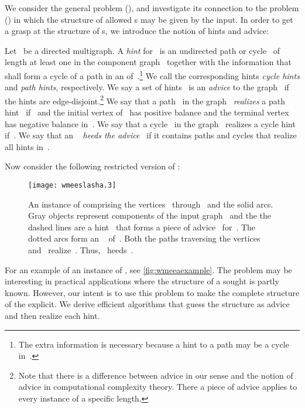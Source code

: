 We consider the general problem \pWMEE{} (\pWMEEs{}), and investigate its connection to the problem \pWMEEA{} (\pWMEEAs{}) in which the structure of allowed \EE s may be given by the input. In order to get a grasp at the structure of \EE s, we introduce the notion of hints and advice:
\begin{definition}
  Let~ be a directed multigraph. A \emph{hint} for~ is an undirected path or cycle~ of length at least one in the component graph~ together with the information that~ shall form a cycle of a path in an \EE{} of~.\footnote{The extra information is necessary because a hint to a path may be a cycle in~.} We call the corresponding hints \emph{cycle hints} and \emph{path hints}, respectively. We say a set of hints~ is an \emph{advice} to the graph~ if the hints are edge-disjoint.\footnote{Note that there is a difference between advice in our sense and the notion of advice in computational complexity theory. There a piece of advice applies to every instance of a specific length.} We say that a path~ in the graph~ \emph{realizes} a path hint~ if~ and the initial vertex of~ has positive balance and the terminal vertex has negative balance in~. We say that a cycle~ in the graph~ realizes a cycle hint~ if~. We say that an \EE~ \emph{heeds the advice~} if it contains paths and cycles that realize all hints in~.
\end{definition}
Now consider the following restricted version of \pWMEEs{}:
\begin{figure}
  \begin{center}
    \texttt{[image: wmeeslasha.3]}
    \caption{An instance of \pWMEEAs{} comprising the vertices~ through~ and the solid arcs. Gray objects represent components of the input graph~ and the the dashed lines are a hint~ that forms a piece of advice~ for~. The dotted arcs form an \EE{}~ of~. Both the paths traversing the vertices~ and~ realize~. Thus,~ heeds~.}
    \label{fig:wmeeaexample}
  \end{center}
\end{figure}For an example of an instance of \pWMEEAs{}, see \autoref{fig:wmeeaexample}. The \pWMEEAs{} problem may be interesting in practical applications where the structure of a sought \EE{} is partly known. However, our intent is to use this problem to make the complete structure of the \EE{} explicit. We derive efficient algorithms that guess the structure as advice and then realize each hint.

